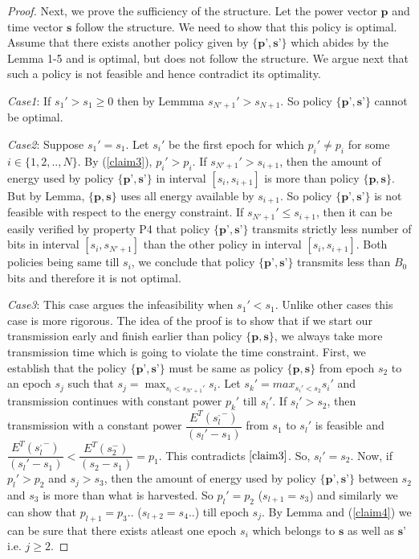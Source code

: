 \begin{proof}
Next, we prove the sufficiency of the structure. Let the power vector $\textbf{p}$ and time vector $\textbf{s}$ follow the structure. We need to show that this policy is optimal. Assume that there exists another policy given by $\{\textbf{p'},\textbf{s'}\}$ which abides by the Lemma 1-5 and is optimal, but does not follow the structure. We argue next that such a policy is not feasible and hence contradict its optimality. 

\textit{Case1}: If $s_1'>s_1\ge 0$ then by Lemmma  $s_{N'+1}'>s_{N+1}$. So policy $\{\textbf{p'},\textbf{s'}\}$ cannot be optimal. 

\textit{Case2}: Suppose $s_1'=s_1$. Let $s_i'$ be the first epoch for which $p_i'\ne p_i$ for some $i \in \{1,2,..,N\}$. By (\ref{claim3}), $p_i'>p_i$. If $s_{N'+1}'>s_{i+1}$, then the amount of energy used by policy $\{ \textbf{p'},\textbf{s'}\}$ in interval $[s_{i},s_{i+1}]$ is more than policy $\{\textbf{p},\textbf{s}\}$. But by Lemma, $\{\textbf{p},\textbf{s}\}$ uses all energy available by $s_{i+1}$. So policy $\{\textbf{p'},\textbf{s'}\}$ is not feasible with respect to the energy constraint. If $s_{N'+1}'\le s_{i+1}$, then it can be easily verified by property P4 that policy $\{\textbf{p'},\textbf{s'}\}$ transmits strictly less number of bits in interval $[s_i,s_{N'+1}]$ than the other policy in interval $[s_{i},s_{i+1}]$. Both policies being same till $s_i$, we conclude that policy $\{\textbf{p'},\textbf{s'}\}$ transmits less than $B_0$  bits and therefore it is not optimal.

\textit{Case3}: This case argues the infeasibility when $s_1'<s_1$. Unlike other cases this case is more rigorous. The idea of the proof is to show that if we start our transmission early and finish earlier than policy $\{\textbf{p},\textbf{s}\}$, we always take more transmission time which is going to violate the time constraint. First, we establish that the policy $\{\textbf{p'},\textbf{s'}\}$ must be same as policy $\{\textbf{p},\textbf{s}\}$ from epoch $s_2$ to an epoch $s_j$ such that $s_j=\max_{s_i<s_{N'+1}'} s_i$. Let $s_k'=max_{s_i'<s_2}s_i'$ and transmission continues with constant power $p_k'$ till $s_l'$. If $s_l'>s_2$, then transmission with a constant power $\dfrac{E^T(s_l^{,-})}{(s_l'-s_1)} $ from $s_1$ to $s_l'$ is feasible and $\dfrac{E^T(s_l^{,-})}{(s_l'-s_1)}<\dfrac{E^T(s_2^-)}{(s_2-s_1)}=p_1$. This contradicts $\ref{claim3}$. So, $s_l'=s_2$. Now, if $p_l'>p_2$ and $s_j>s_3$, then the amount of energy used by policy $\{\textbf{p'},\textbf{s'}\}$ between $s_2$ and $s_3$ is more than what is harvested. So $p_l'=p_2$ ($s_{l+1}=s_3$) and similarly we can show that $p_{l+1}=p_3$.. ($ s_{l+2}=s_4$..) till epoch $s_j$. By Lemma and (\ref{claim4}) we can be sure that there exists atleast one epoch $s_i$ which belongs to $\textbf{s}$ as well as $\textbf{s'}$ i.e. $j\ge 2$.


\end{proof}
